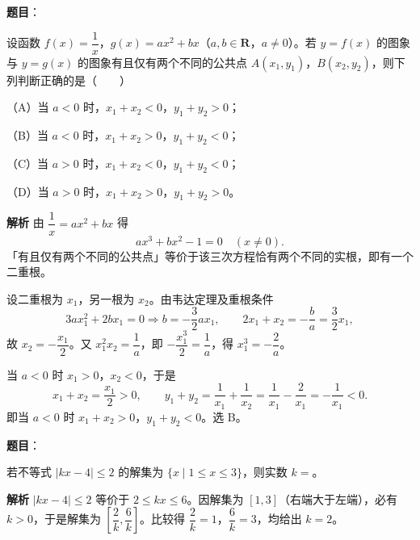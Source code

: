 \begin{answer}

\textbf{题目}：

设函数 $f(x)=\dfrac1x$，$g(x)=ax^2+bx$（$a,b\in\mathbf R$，$a\neq0$）。若 $y=f(x)$ 的图象与 $y=g(x)$ 的图象有且仅有两个不同的公共点 $A(x_1,y_1)$，$B(x_2,y_2)$，则下列判断正确的是\mbox{（　　）}

（A）当 $a<0$ 时，$x_1+x_2<0$，$y_1+y_2>0$；

（B）当 $a<0$ 时，$x_1+x_2>0$，$y_1+y_2<0$；

（C）当 $a>0$ 时，$x_1+x_2<0$，$y_1+y_2<0$；

（D）当 $a>0$ 时，$x_1+x_2>0$，$y_1+y_2>0$。

\textbf{解析}
由 $\dfrac1x=ax^2+bx$ 得
\nopagebreak[4]
\[ax^3+bx^2-1=0\quad(x\neq0).\]
「有且仅有两个不同的公共点」等价于该三次方程恰有两个不同的实根，即有一个二重根。

设二重根为 $x_1$，另一根为 $x_2$。由韦达定理及重根条件
\nopagebreak[4]
\[3ax_1^2+2bx_1=0\Rightarrow b=-\frac32ax_1,\qquad 2x_1+x_2=-\frac ba=\frac32x_1,\]
故 $x_2=-\dfrac{x_1}2$。又 $x_1^2x_2=\dfrac1a$，即 $-\dfrac{x_1^3}2=\dfrac1a$，得 $x_1^3=-\dfrac2a$。

当 $a<0$ 时 $x_1>0$，$x_2<0$，于是
\nopagebreak[4]
\[x_1+x_2=\frac{x_1}2>0,\qquad y_1+y_2=\frac1{x_1}+\frac1{x_2}=\frac1{x_1}-\frac2{x_1}=-\frac1{x_1}<0.\]
即当 $a<0$ 时 $x_1+x_2>0$，$y_1+y_2<0$。选 B。


\end{answer}
\begin{answer}

\textbf{题目}：

若不等式 $|kx-4|\leqslant2$ 的解集为 $\{x\mid1\leqslant x\leqslant3\}$，则实数 $k=$\gkblank{}。

\textbf{解析}
$|kx-4|\leqslant2$ 等价于 $2\leqslant kx\leqslant6$。因解集为 $[1,3]$（右端大于左端），必有 $k>0$，于是解集为 $\left[\dfrac2k,\dfrac6k\right]$。比较得 $\dfrac2k=1$，$\dfrac6k=3$，均给出 $k=2$。


\end{answer}

